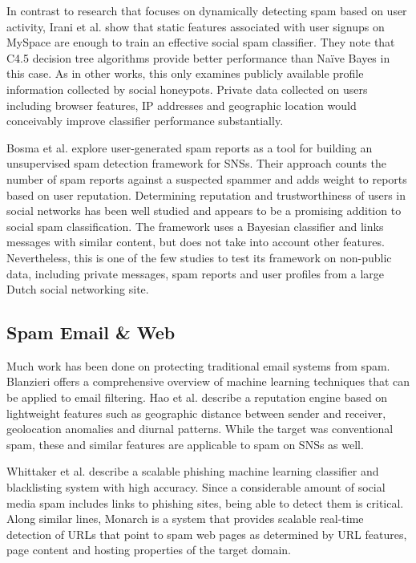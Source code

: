 \documentclass[preprint]{acm_proc_article-sp}
\begin{document}
In contrast to research that focuses on dynamically detecting spam based on user activity, Irani et al. \cite{irani} show that static features associated with user signups on MySpace are enough to train an effective social spam classifier. They note that C4.5 decision tree algorithms provide better performance than Na\"ive Bayes in this case. As in other works, this only examines publicly available profile information collected by social honeypots. Private data collected on users including browser features, IP addresses and geographic location would conceivably improve classifier performance substantially.

Bosma et al. \cite{bosma} explore user-generated spam reports as a tool for building an unsupervised spam detection framework for SNSs. Their approach counts the number of spam reports against a suspected spammer and adds weight to reports based on user reputation. Determining reputation and trustworthiness of users in social networks has been well studied \cite{bian, guha, zhang} and appears to be a promising addition to social spam classification. The framework uses a Bayesian classifier and links messages with similar content, but does not take into account other features. Nevertheless, this is one of the few studies to test its framework on non-public data, including private messages, spam reports and user profiles from a large Dutch social networking site.

\subsection{Spam Email \& Web}

Much work has been done on protecting traditional email systems from spam. Blanzieri \cite{blanzieri} offers a comprehensive overview of machine learning techniques that can be applied to email filtering. Hao et al. \cite{hao} describe a reputation engine based on lightweight features such as geographic distance between sender and receiver, geolocation anomalies and diurnal patterns. While the target was conventional spam, these and similar features are applicable to spam on SNSs as well.

Whittaker et al. \cite{whittaker} describe a scalable phishing machine learning classifier and blacklisting system with high accuracy. Since a considerable amount of social media spam includes links to phishing sites, being able to detect them is critical. Along similar lines, Monarch \cite{thomas} is a system that provides scalable real-time detection of URLs that point to spam web pages as determined by URL features, page content and hosting properties of the target domain.
\end{document}
